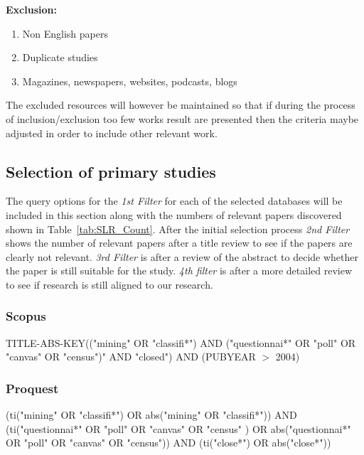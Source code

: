 \noindent
\textbf{Exclusion:}
\begin{enumerate}
  \item Non English papers
  \item Duplicate studies
  \item Magazines, newspapers, websites, podcasts, blogs
\end{enumerate}

\noindent
The excluded resources will however be maintained so that if during the process of inclusion/exclusion too few works result are presented then the criteria maybe adjusted in order to include other relevant work.

\subsection{Selection of primary studies}

The query options for the \textit{1st Filter} for each of the selected databases will be included in this section along with the numbers of relevant papers discovered shown in Table~\ref{tab:SLR_Count}.
After the initial selection process \textit{2nd Filter} shows the number of relevant papers after a title review to see if the papers are clearly not relevant. \textit{3rd Filter} is after a review of the abstract to decide whether the paper is still suitable for the study. \textit{4th filter} is after a more detailed review to see if research is still aligned to our research.



\subsubsection{Scopus}
\noindent
TITLE-ABS-KEY(("mining" OR "classifi*") AND ("questionnai*" OR "poll" OR "canvas" OR "census")" AND "closed") AND (PUBYEAR $>$ 2004)

\subsubsection{Proquest}
\noindent
(ti("mining" OR "classifi*") OR abs("mining" OR "classifi*")) AND (ti("questionnai*" OR "poll" OR "canvas" OR "census" ) OR abs("questionnai*" OR "poll" OR "canvas" OR "census")) AND (ti("close*") OR abs("close*"))

